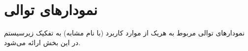 \chapter{نمودارهای توالی}

نمودارهای توالی مربوط به هریک از موارد کاربرد (با نام مشابه) به تفکیک زیرسیستم در این بخش ارائه می‌شود.

\newpage
